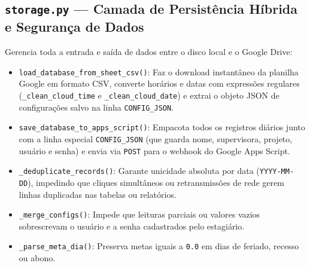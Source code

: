 \documentclass[11pt,a4paper]{article}
\begin{document}
\subsection{\texttt{storage.py} --- Camada de Persistência Híbrida e Segurança de Dados}
Gerencia toda a entrada e saída de dados entre o disco local e o Google Drive:
\begin{itemize}[leftmargin=1.5em]
    \item \texttt{load\_database\_from\_sheet\_csv()}: Faz o download instantâneo da planilha Google em formato CSV, converte horários e datas com expressões regulares (\texttt{\_clean\_cloud\_time} e \texttt{\_clean\_cloud\_date}) e extrai o objeto JSON de configurações salvo na linha \texttt{CONFIG\_JSON}.
    \item \texttt{save\_database\_to\_apps\_script()}: Empacota todos os registros diários junto com a linha especial \texttt{CONFIG\_JSON} (que guarda nome, supervisora, projeto, usuário e senha) e envia via \texttt{POST} para o webhook do Google Apps Script.
    \item \texttt{\_deduplicate\_records()}: Garante unicidade absoluta por data (\texttt{YYYY-MM-DD}), impedindo que cliques simultâneos ou retransmissões de rede gerem linhas duplicadas nas tabelas ou relatórios.
    \item \texttt{\_merge\_configs()}: Impede que leituras parciais ou valores vazios sobrescrevam o usuário e a senha cadastrados pelo estagiário.
    \item \texttt{\_parse\_meta\_dia()}: Preserva metas iguais a \texttt{0.0} em dias de feriado, recesso ou abono.
\end{itemize}
\end{document}
